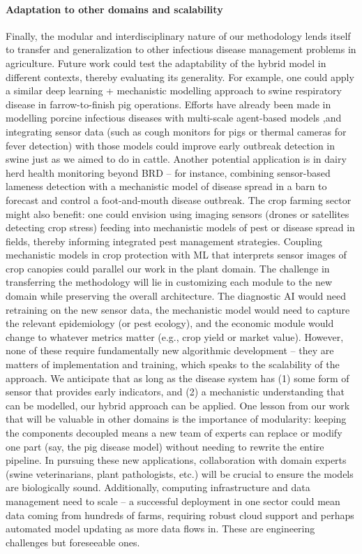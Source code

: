 \paragraph{Adaptation to other domains and scalability} Finally, the modular and interdisciplinary nature of our methodology lends itself to transfer and generalization to other infectious disease management problems in agriculture. Future work could test the adaptability of the hybrid model in different contexts, thereby evaluating its generality. For example, one could apply a similar deep learning + mechanistic modelling approach to swine respiratory disease in farrow-to-finish pig operations. Efforts have already been made in modelling porcine infectious diseases with multi-scale agent-based models \cite{Sicard2022},and integrating sensor data (such as cough monitors for pigs or thermal cameras for fever detection) with those models could improve early outbreak detection in swine just as we aimed to do in cattle. Another potential application is in dairy herd health monitoring beyond BRD – for instance, combining sensor-based lameness detection with a mechanistic model of disease spread in a barn to forecast and control a foot-and-mouth disease outbreak. The crop farming sector might also benefit: one could envision using imaging sensors (drones or satellites detecting crop stress) feeding into mechanistic models of pest or disease spread in fields, thereby informing integrated pest management strategies. Coupling mechanistic models in crop protection with ML that interprets sensor images of crop canopies could parallel our work in the plant domain. The challenge in transferring the methodology will lie in customizing each module to the new domain while preserving the overall architecture. The diagnostic AI would need retraining on the new sensor data, the mechanistic model would need to capture the relevant epidemiology (or pest ecology), and the economic module would change to whatever metrics matter (e.g., crop yield or market value). However, none of these require fundamentally new algorithmic development – they are matters of implementation and training, which speaks to the scalability of the approach. We anticipate that as long as the disease system has (1) some form of sensor that provides early indicators, and (2) a mechanistic understanding that can be modelled, our hybrid approach can be applied. One lesson from our work that will be valuable in other domains is the importance of modularity: keeping the components decoupled means a new team of experts can replace or modify one part (say, the pig disease model) without needing to rewrite the entire pipeline. In pursuing these new applications, collaboration with domain experts (swine veterinarians, plant pathologists, etc.) will be crucial to ensure the models are biologically sound. Additionally, computing infrastructure and data management need to scale – a successful deployment in one sector could mean data coming from hundreds of farms, requiring robust cloud support and perhaps automated model updating as more data flows in. These are engineering challenges but foreseeable ones. 
